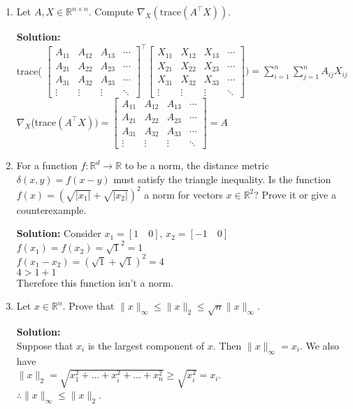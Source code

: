 \documentclass{article}
\newcommand{\solution}{\textbf{Solution: }}
\newcommand{\R}{\mathbb{R}}
\begin{document}
\begin{enumerate}[label=(\alph*)]
    \item Let $A, X \in \R^{n \times n}$. Compute $\nabla_X (\text{trace}(A^{\top}X))$. 
    \begin{mdframed} \solution\\
    trace(
    $\begin{bmatrix}
    A_{11} & A_{12} & A_{13} & \cdots\\
    A_{21} & A_{22} & A_{23} & \cdots\\
    A_{31} & A_{32} & A_{33} & \cdots\\
    \vdots & \vdots & \vdots & \ddots
    \end{bmatrix}^{\top}
    \begin{bmatrix}
    X_{11} & X_{12} & X_{13} & \cdots\\
    X_{21} & X_{22} & X_{23} & \cdots\\
    X_{31} & X_{32} & X_{33} & \cdots\\
    \vdots & \vdots & \vdots & \ddots
    \end{bmatrix})=\sum_{i=1}^{n}\sum_{j=1}^{n}A_{ij}X_{ij}$\\
    $\nabla_X$(trace$(A^{\top}X))=
    \begin{bmatrix}
    A_{11} & A_{12} & A_{13} & \cdots\\
    A_{21} & A_{22} & A_{23} & \cdots\\
    A_{31} & A_{32} & A_{33} & \cdots\\
    \vdots & \vdots & \vdots & \ddots
    \end{bmatrix}=A$
    \end{mdframed}
    
    \item For a function $f: \R^d \rightarrow \R$ to be a norm, the distance metric $\delta(x, y) = f(x-y)$  must satisfy the triangle inequality. Is the function $f(x) = (\sqrt{|x_1|} + \sqrt{|x_2|})^2$ a norm for vectors $x \in \R^2$? Prove it or give a counterexample. 
    \begin{mdframed} \solution
    Consider $x_1=[1 \quad 0]$, $x_2=[-1 \quad 0]$\\
    $f(x_1)=f(x_2)=\sqrt{1}^2=1$\\
    $f(x_1-x_2)=(\sqrt{1}+\sqrt{1})^2=4$\\
    $4>1+1$\\
    Therefore this function isn't a norm.
    \end{mdframed}
    
    \newpage
    
    \item Let $x \in \R^n$. Prove that $\lVert x \rVert_{\infty} \leq \lVert x\rVert_2 \leq \sqrt{n} \lVert x \rVert_{\infty}$. 
    \begin{mdframed} \solution \\
    Suppose that $x_i$ is the largest component of $x$. Then $\lVert x \rVert_{\infty} = x_i$. We also have\\
    $\lVert x \rVert_2 = \sqrt{x_1^2 + \dots + x_i^2 + \dots + x_n^2} \geq \sqrt{x_i^2} = x_i$.\\
    $\therefore \lVert x \rVert_{\infty} \leq \lVert x\rVert_2$.\\
    

\end{mdframed}
\end{enumerate}
\end{document}
